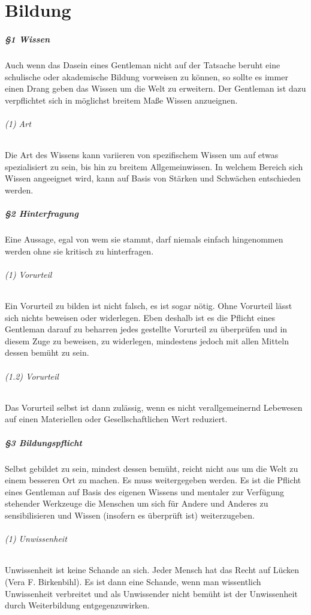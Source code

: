 \chapter{Bildung}
\paragraph{§1 Wissen}
Auch wenn das Dasein eines Gentleman nicht auf der Tatsache beruht eine schulische oder akademische Bildung vorweisen zu können, so sollte es immer einen Drang geben das Wissen um die Welt zu erweitern. Der Gentleman ist dazu verpflichtet sich in möglichst breitem Maße Wissen anzueignen.

\subparagraph{(1) Art} Die Art des Wissens kann variieren von spezifischem Wissen um auf etwas spezialisiert zu sein, bis hin zu breitem Allgemeinwissen. In welchem Bereich sich Wissen angeeignet wird, kann auf Basis von Stärken und Schwächen entschieden werden.

\paragraph{§2 Hinterfragung}
Eine Aussage, egal von wem sie stammt, darf niemals einfach hingenommen werden ohne sie kritisch zu hinterfragen.

\subparagraph{(1) Vorurteil}
Ein Vorurteil zu bilden ist nicht falsch, es ist sogar nötig. Ohne Vorurteil lässt sich nichts beweisen oder widerlegen. Eben deshalb ist es die Pflicht eines Gentleman darauf zu beharren jedes gestellte Vorurteil zu überprüfen und in diesem Zuge zu beweisen, zu widerlegen, mindestens jedoch mit allen Mitteln dessen bemüht zu sein.

\subparagraph{(1.2) Vorurteil}
Das Vorurteil selbst ist dann zulässig, wenn es nicht verallgemeinernd Lebewesen auf einen Materiellen oder Gesellschaftlichen Wert reduziert.

\paragraph{§3 Bildungspflicht}
Selbst gebildet zu sein, mindest dessen bemüht, reicht nicht aus um die Welt zu einem besseren Ort zu machen. Es muss weitergegeben werden. Es ist die Pflicht eines Gentleman auf Basis des eigenen Wissens und mentaler zur Verfügung stehender Werkzeuge die Menschen um sich für Andere und Anderes zu sensibilisieren und Wissen (insofern es überprüft ist) weiterzugeben.

\subparagraph{(1) Unwissenheit}
Unwissenheit ist keine Schande an sich. \glqq Jeder Mensch hat das Recht auf Lücken\grqq \\  (Vera F. Birkenbihl). Es ist dann eine Schande, wenn man wissentlich Unwissenheit verbreitet und als Unwissender nicht bemüht ist der Unwissenheit durch Weiterbildung entgegenzuwirken.

